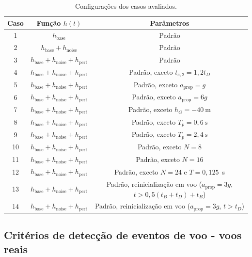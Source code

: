 \documentclass[12pt,a4paper]{article}
\begin{document}
\begin{table}[!ht]
	\centering
	\caption{Configurações dos casos avaliados.}
	\begin{tabular}{ccc}
		\toprule
		Caso & Função $h(t)$ & Parâmetros\\
		\midrule
		1&$h_\text{base}$& Padrão\\
		2&$h_\text{base}+h_\text{noise}$& Padrão\\
		3&$h_\text{base}+h_\text{noise}+h_\text{pert}$& Padrão\\
		4&$h_\text{base}+h_\text{noise}+h_\text{pert}$& Padrão, exceto $t_{e,2}=1,2t_D$\\
		5&$h_\text{base}+h_\text{noise}+h_\text{pert}$& Padrão, exceto $a_\text{prop}=g$\\
		6&$h_\text{base}+h_\text{noise}+h_\text{pert}$& Padrão, exceto $a_\text{prop}=6g$\\
		7&$h_\text{base}+h_\text{noise}+h_\text{pert}$& Padrão, exceto $h_G=-40~\text{m}$\\
		8&$h_\text{base}+h_\text{noise}+h_\text{pert}$& Padrão, exceto $T_p=0,6~\text{s}$\\
		9&$h_\text{base}+h_\text{noise}+h_\text{pert}$& Padrão, exceto $T_p=2,4~\text{s}$\\		
		10&$h_\text{base}+h_\text{noise}+h_\text{pert}$& Padrão, exceto $N=8$\\	
		11&$h_\text{base}+h_\text{noise}+h_\text{pert}$& Padrão, exceto $N=16$\\	
		12&$h_\text{base}+h_\text{noise}+h_\text{pert}$& Padrão, exceto $N=24$ e $T=0,125$~s \\	
		13&$h_\text{base}+h_\text{noise}+h_\text{pert}$& Padrão, reinicialização em voo ($a_\text{prop}=3g$, $t>0,5(t_B+t_D)+t_B$) \\
		14&$h_\text{base}+h_\text{noise}+h_\text{pert}$& Padrão, reinicialização em voo ($a_\text{prop}=3g$, $t>t_D$) \\
		\bottomrule
	\end{tabular}
	\label{tab:flightcases}
\end{table}

\subsection{Critérios de detecção de eventos de voo - voos reais}
\label{sec:realflightsforeventsverification}
\end{document}
